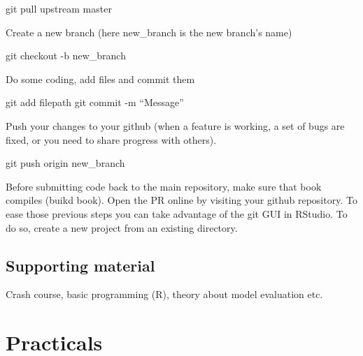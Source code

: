 \documentclass[12pt,oneside]{book}
\newenvironment{Shaded}{\begin{snugshade}}{\end{snugshade}}
\newcommand{\FunctionTok}[1]{\textcolor[rgb]{0.00,0.00,0.00}{#1}}
\newcommand{\NormalTok}[1]{#1}
\begin{document}
\begin{Shaded}
\begin{Highlighting}[]
\FunctionTok{git}\NormalTok{ pull upstream master}
\end{Highlighting}
\end{Shaded}

Create a new branch (here new\_branch is the new branch's name)

\begin{Shaded}
\begin{Highlighting}[]
\FunctionTok{git}\NormalTok{ checkout -b new_branch}
\end{Highlighting}
\end{Shaded}

Do some coding, add files and commit them

\begin{Shaded}
\begin{Highlighting}[]
\FunctionTok{git}\NormalTok{ add filepath}
\FunctionTok{git}\NormalTok{ commit -m “Message”}
\end{Highlighting}
\end{Shaded}

Push your changes to your github (when a feature is working, a set of
bugs are fixed, or you need to share progress with others).

\begin{Shaded}
\begin{Highlighting}[]
\FunctionTok{git}\NormalTok{ push origin new_branch}
\end{Highlighting}
\end{Shaded}

Before submitting code back to the main repository, make sure that book
compiles (buikd book). Open the PR online by visiting your github
repository. To ease those previous steps you can take advantage of the
git GUI in RStudio. To do so, create a new project from an existing
directory.

\chapter*{Supporting material}\label{supporting-material}

Crash course, basic programming (R), theory about model evaluation etc.

\part{Practicals}\label{part-practicals}
\end{document}
